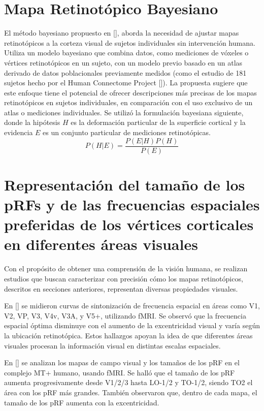 \section{Mapa Retinotópico Bayesiano}

El método bayesiano propuesto en [\cite{benson_bayesian_2018}], aborda la necesidad de ajustar mapas retinotópicos a la corteza visual de sujetos individuales sin intervención humana. Utiliza un modelo bayesiano que combina datos, como mediciones de v\'oxeles o vértices retinotópicos en un sujeto, con un modelo previo basado en un atlas derivado de datos poblacionales previamente medidos (como el estudio de 181 sujetos hecho por el Human Connectome Project [\cite{benson_human_2018}]). La propuesta sugiere que este enfoque tiene el potencial de ofrecer descripciones más precisas de los mapas retinotópicos en sujetos individuales, en comparación con el uso exclusivo de un atlas o mediciones individuales. Se utiliz\'o la formulaci\'on bayesiana siguiente, donde la hipótesis $H$ es la deformación particular de la superficie cortical y la evidencia $E$ es un conjunto particular de mediciones retinotópicas.
\begin{equation}
	P(H|E) = \dfrac{P(E|H)P(H)}{P(E)}
\end{equation}


\section{Representaci\'on del tama\~no de los pRFs y de las frecuencias espaciales preferidas de los v\'ertices corticales en diferentes \'areas visuales}

Con el propósito de obtener una comprensión de la visión humana, se realizan estudios que buscan caracterizar con precisión cómo los mapas retinotópicos, descritos en secciones anteriores, representan diversas propiedades visuales.

En [\cite{henriksson_spatial_2008}] se midieron curvas de sintonización de frecuencia espacial en áreas como V1, V2, VP, V3, V4v, V3A, y V5+, utilizando fMRI. Se observó que la frecuencia espacial óptima disminuye con el aumento de la excentricidad visual y varía según la ubicación retinotópica. Estos hallazgos apoyan la idea de que diferentes áreas visuales procesan la información visual en distintas escalas espaciales.

En [\cite{amano_visual_2009}] se analizan los mapas de campo visual y los tamaños de los pRF en el complejo MT+ humano, usando fMRI. Se halló que el tamaño de los pRF aumenta progresivamente desde V1/2/3 hasta LO-1/2 y TO-1/2, siendo TO2 el área con los pRF más grandes. También observaron que, dentro de cada mapa, el tamaño de los pRF aumenta con la excentricidad.

